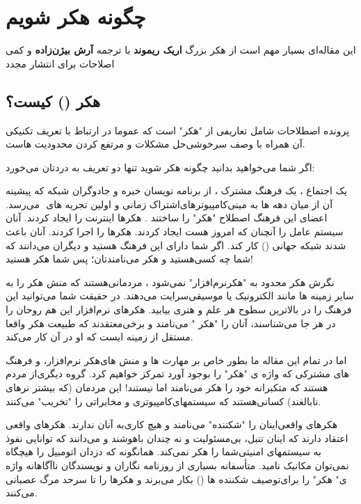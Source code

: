 \section{چگونه هکر شویم}
\begin{mdframed}
این مقاله‌ای بسیار مهم است از هکر بزرگ
\textbf{اریک ریموند}
با ترجمه
\textbf{آرش بیژن‌زاده}
و کمی اصلاحات برای انتشار مجدد
\end{mdframed}

\subsection*{هکر () کیست؟}
پرونده اصطلاحات
 شامل تعاریفی‌ از "هکر" است که عموما در ارتباط با تعریف تکنیکی‌ آن همراه با وصف سرخوشی‌حل مشکلات و مرتفع کردن محدودیت هاست.
 
 اگر شما می‌خواهید بدانید چگونه هکر شوید تنها دو تعریف به دردتان می‌خورد:

یک اجتماع ، یک فرهنگ مشترک ، از برنامه نویسان خبره و جادوگران شبکه که پیشینه آن از میان دهه ها به مینی‌کامپیوترهای‌اشتراک زمانی
و اولین تجریه های ‌
 می‌رسد. اعضای این فرهنگ اصطلاح "هکر" را ساختند . هکرها اینترنت را ایجاد کردند. آنان سیستم عامل
 را آنچنان که امروز هست ایجاد کردند. هکرها 
 را اجرا کردند. آنان باعث شدند شبکه جهانی () کار کند.
 اگر شما دارای این فرهنگ هستید و دیگران می‌دانند که شما چه کسی‌هستید و هکر می‌نامندتان؛ پس شما هکر هستید!
 
نگرش هکر محدود به "هکرنرم‌افزار" نمی‌شود ، مردمانی‌هستند که منش هکر را به سایر زمینه ها مانند الکترونیک یا موسیقی‌سرایت می‌دهند. در حقیقت شما می‌توانید این فرهنگ را در بالاترین سطوح هر علم و هنری بیابید. هکرهای نرم‌افزار این هم روحان را در هر جا می‌شناسند، آنان را "هکر " می‌نامند و برخی‌معتقدند که طبیعت هکر واقعا مستقل از زمینه ایست که او در آن کار می‌کند. 

اما در تمام این مقاله ما بطور خاص بر مهارت ها و منش های‌هکر نرم‌افزار، و فرهنگ های مشترکی که واژه ی "هکر" را بوجود آورد تمرکز خواهیم کرد.
گروه دیگری‌از مردم هستند که متکبرانه خود را هکر می‌نامند اما نیستند! این مردمان (که بیشتر نرهای نابالغند) کسانی‌هستند که سیستمهای‌کامپیوتری و مخابراتی را "تخریب" می‌کنند.

 هکرهای واقعی‌اینان را "شکننده" می‌نامند و هیچ کاری‌به آنان ندارند. هکرهای واقعی اعتقاد دارند که اینان تنبل، بی‌مسئولیت و نه چندان باهوشند و می‌دانند که توانایی نفوذ به سیستمهای امنیتی‌شما را هکر نمی‌کند. همانگونه که دزدان اتومبیل را هیچگاه نمی‌توان مکانیک نامید. متأسفانه بسیاری از روزنامه نگاران و نویسندگان ناآگاهانه وا‌ژه ی" هکر" را برای‌توصیف شکننده ها () بکار می‌برند و هکرها را تا سرحد مرگ عصبانی می‌کنند.

